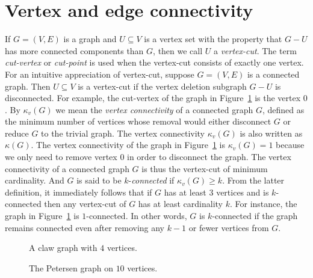 
\section{Vertex and edge connectivity}

If $G = (V,E)$ is a graph and $U \subseteq V$ is a vertex set with the
property that $G - U$ has more connected components than $G$, then we
call $U$ a \emph{vertex-cut}. The term
\emph{cut-vertex} or
\emph{cut-point} is used when the vertex-cut consists
of exactly one vertex. For an intuitive appreciation of vertex-cut,
suppose $G = (V,E)$ is a connected graph. Then $U \subseteq V$ is a
vertex-cut if the vertex deletion
subgraph $G - U$ is disconnected. For example, the cut-vertex of the
graph in Figure~\ref{fig:distance_connectivity:claw_graph} is the
vertex $0$. By $\kappa_v(G)$ we mean the
\emph{vertex connectivity} of a connected
graph $G$, defined as the minimum number of vertices whose removal
would either disconnect $G$ or reduce $G$ to the trivial graph. The
vertex connectivity $\kappa_v(G)$ is also written as
$\kappa(G)$. The vertex connectivity of the graph
in Figure~\ref{fig:distance_connectivity:claw_graph} is
$\kappa_v(G) = 1$ because we only need to remove vertex $0$ in order
to disconnect the graph. The vertex connectivity of a connected graph
$G$ is thus the vertex-cut of minimum cardinality. And $G$ is said to
be $k$-\emph{connected} if $\kappa_v(G) \geq k$.
From the latter definition, it immediately follows that if $G$ has at
least $3$ vertices and is $k$-connected then any vertex-cut of $G$ has
at least cardinality $k$. For instance, the graph in
Figure~\ref{fig:distance_connectivity:claw_graph} is $1$-connected. In
other words, $G$ is $k$-connected if the graph remains connected even
after removing any $k - 1$ or fewer vertices from $G$.

\begin{figure}[!htbp]
\centering
{}

\caption{A claw graph with $4$ vertices.}
\label{fig:distance_connectivity:claw_graph}
\end{figure}

\begin{figure}[!htbp]
\centering
{}

\caption{The Petersen graph on $10$ vertices.}
\label{fig:distance_connectivity:petersen_graph}
\end{figure}

